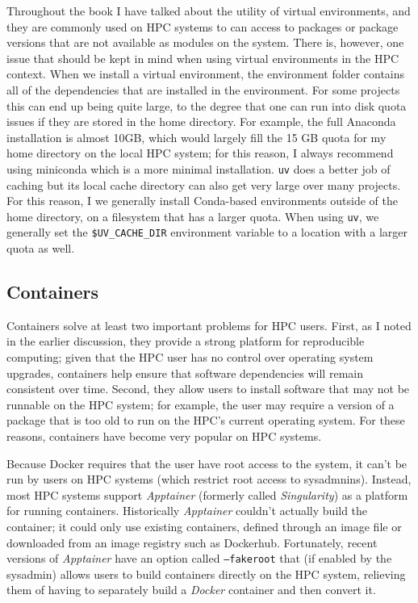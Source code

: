 Throughout the book I have talked about the utility of virtual environments, and they are commonly used on HPC systems to can access to packages or package versions that are not available as modules on the system. There is, however, one issue that should be kept in mind when using virtual environments in the HPC context.  When we install a virtual environment, the environment folder contains all of the dependencies that are installed in the environment. For some projects this can end up being quite large, to the degree that one can run into disk quota issues if they are stored in the home directory. For example, the full Anaconda installation is almost 10GB, which would largely fill the 15 GB quota for my home directory on the local HPC system; for this reason, I always recommend using miniconda which is a more minimal installation.  \texttt{uv} does a better job of caching but its local cache directory can also get very large over many projects.  For this reason, I we generally install Conda-based environments outside of the home directory, on a filesystem that has a larger quota.  When using \texttt{uv}, we generally set the \texttt{\$UV\_CACHE\_DIR} environment variable to a location with a larger quota as well.

\subsection{Containers}

Containers solve at least two important problems for HPC users.  First, as I noted in the earlier discussion, they provide a strong platform for reproducible computing; given that the HPC user has no control over operating system upgrades, containers help ensure that software dependencies will remain consistent over time.  Second, they allow users to install software that may not be runnable on the HPC system; for example, the user may require a version of a package that is too old to run on the HPC's current operating system.  For these reasons, containers have become very popular on HPC systems.

Because Docker requires that the user have root access to the system, it can't be run by users on HPC systems (which restrict root access to sysadmnins).  Instead, most HPC systems support \textit{Apptainer} (formerly called \textit{Singularity}) as a platform for running containers. Historically \textit{Apptainer} couldn't actually build the container; it could only use existing containers, defined through an image file or downloaded from an image registry such as Dockerhub.  Fortunately, recent versions of \textit{Apptainer} have an option called \texttt{--fakeroot} that (if enabled by the sysadmin) allows users to build containers directly on the HPC system, relieving them of having to separately build a \textit{Docker} container and then convert it. 

